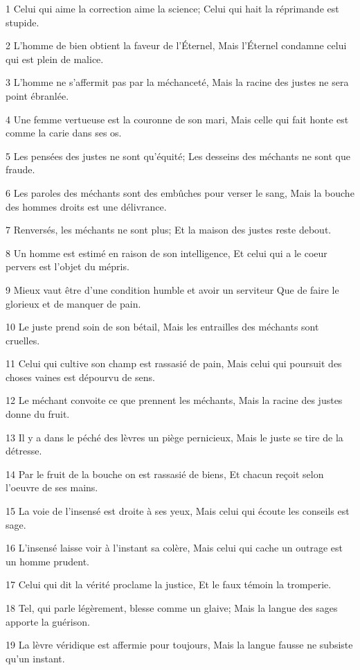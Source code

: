 \par 1 Celui qui aime la correction aime la science; Celui qui hait la réprimande est stupide.
\par 2 L'homme de bien obtient la faveur de l'Éternel, Mais l'Éternel condamne celui qui est plein de malice.
\par 3 L'homme ne s'affermit pas par la méchanceté, Mais la racine des justes ne sera point ébranlée.
\par 4 Une femme vertueuse est la couronne de son mari, Mais celle qui fait honte est comme la carie dans ses os.
\par 5 Les pensées des justes ne sont qu'équité; Les desseins des méchants ne sont que fraude.
\par 6 Les paroles des méchants sont des embûches pour verser le sang, Mais la bouche des hommes droits est une délivrance.
\par 7 Renversés, les méchants ne sont plus; Et la maison des justes reste debout.
\par 8 Un homme est estimé en raison de son intelligence, Et celui qui a le coeur pervers est l'objet du mépris.
\par 9 Mieux vaut être d'une condition humble et avoir un serviteur Que de faire le glorieux et de manquer de pain.
\par 10 Le juste prend soin de son bétail, Mais les entrailles des méchants sont cruelles.
\par 11 Celui qui cultive son champ est rassasié de pain, Mais celui qui poursuit des choses vaines est dépourvu de sens.
\par 12 Le méchant convoite ce que prennent les méchants, Mais la racine des justes donne du fruit.
\par 13 Il y a dans le péché des lèvres un piège pernicieux, Mais le juste se tire de la détresse.
\par 14 Par le fruit de la bouche on est rassasié de biens, Et chacun reçoit selon l'oeuvre de ses mains.
\par 15 La voie de l'insensé est droite à ses yeux, Mais celui qui écoute les conseils est sage.
\par 16 L'insensé laisse voir à l'instant sa colère, Mais celui qui cache un outrage est un homme prudent.
\par 17 Celui qui dit la vérité proclame la justice, Et le faux témoin la tromperie.
\par 18 Tel, qui parle légèrement, blesse comme un glaive; Mais la langue des sages apporte la guérison.
\par 19 La lèvre véridique est affermie pour toujours, Mais la langue fausse ne subsiste qu'un instant.
